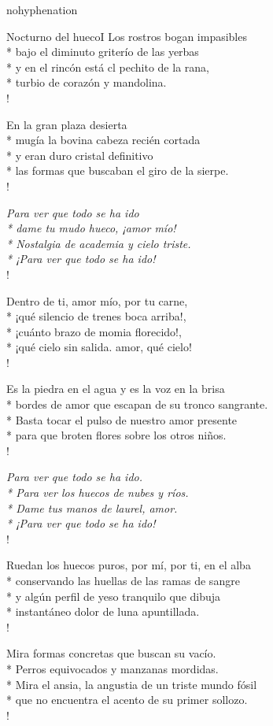 \documentclass[
    a5paper,
    DIV=10,
    12pt,
    notitlepage,
    oneside,]
{scrbook} %
\begin{document}
\begin{hyphenrules}{nohyphenation}
\begin{poem}{Nocturno del hueco}{I}{}
Los rostros bogan impasibles\\*
bajo el diminuto griterío de las yerbas\\*
y en el rincón está cl pechito de la rana,\\*
turbio de corazón y mandolina.\\!

En la gran plaza desierta\\*
mugía la bovina cabeza recién cortada\\*
y eran duro cristal definitivo\\*
las formas que buscaban el giro de la sierpe.\\!

\emph{Para ver que todo se ha ido\\*
dame tu mudo hueco, ¡amor mío!\\*
Nostalgia de academia y cielo triste.\\*
¡Para ver que todo se ha ido!} \\!

Dentro de ti, amor mío, por tu carne,\\*
¡qué silencio de trenes boca arriba!,\\*
¡cuánto brazo de momia florecido!,\\*
¡qué cielo sin salida. amor, qué cielo! \\!

Es la piedra en el agua y es la voz en la brisa\\*
bordes de amor que escapan de su tronco sangrante.\\*
Basta tocar el pulso de nuestro amor presente\\*
para que broten flores sobre los otros niños.\\!

\emph{Para ver que todo se ha ido.\\*
Para ver los huecos de nubes y ríos.\\*
Dame tus manos de laurel, amor.\\*
¡Para ver que todo se ha ido!} \\!

Ruedan los huecos puros, por mí, por ti, en el alba\\*
conservando las huellas de las ramas de sangre\\*
y algún perfil de yeso tranquilo que dibuja\\*
instantáneo dolor de luna apuntillada.\\!

Mira formas concretas que buscan su vacío.\\*
Perros equivocados y manzanas mordidas.\\*
Mira el ansia, la angustia de un triste mundo fósil\\*
que no encuentra el acento de su primer sollozo.\\!


\end{poem}
\end{hyphenrules}
\end{document}
